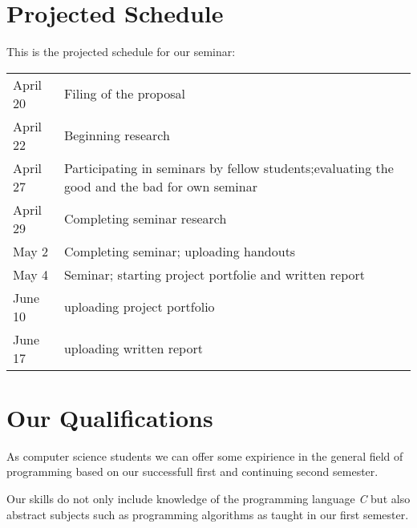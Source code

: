 \section*{Projected Schedule}
This is the projected schedule for our seminar:\\
\begin{tabular}{L{0.15} L{0.7}}
April 20 & Filing of the proposal\\
April 22 & Beginning research\\
April 27 \newline & Participating in seminars by fellow students;\newline evaluating the good and the bad for own seminar\\
April 29 & Completing seminar research\\
May 2 & Completing seminar; uploading handouts\\
May 4 & Seminar; starting project portfolie and written report\\
June 10 & uploading project portfolio\\
June 17 & uploading written report
\end{tabular}
\section*{Our Qualifications}
As computer science students we can offer some expirience in the general field of programming based on our successfull first and continuing second semester.

Our skills do not only include knowledge of the programming language \emph{C} but also abstract subjects such as programming algorithms as taught in our first semester.
 
